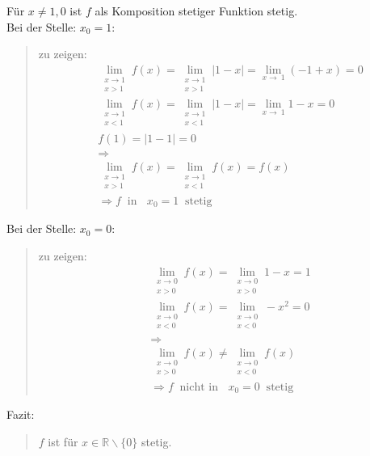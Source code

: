 Für $ x\neq 1,0 $ ist $ f $ als Komposition stetiger Funktion stetig.\vspace*{2mm}\\
\newpage
\noindent
\textbullet \;\; Bei der Stelle: $ x_0=1 $:
\begin{quote}
	zu zeigen:\\
	\begin{align*}
	&\lim\limits_ {\substack{x \to 1 \\ x>1}} f(x)=	\lim\limits_ {\substack{x \to 1 \\ x>1}}|1-x|=\lim\limits_ {x\to\ 1}(-1+x)=0\\
	&\lim\limits_ {\substack{x \to 1 \\ x<1}} f(x)=	\lim\limits_ {\substack{x \to 1 \\ x<1}}|1-x|=\lim\limits_ {x\to\ 1}1-x=0\\
	&f(1)=|1-1|=0\\
	&\Rightarrow\\
	&\lim\limits_ {\substack{x \to 1 \\ x>1}} f(x)=\lim\limits_ {\substack{x \to 1 \\ x<1}}f(x)=f(x)\\
	&\Rightarrow f\;\; \text{in }\;\;x_0=1\;\;\text{stetig }
	\end{align*}
	
\end{quote}
\textbullet \;\; Bei der Stelle: $ x_0=0 $:
\begin{quote}
	zu zeigen:\\
	\begin{align*}
	&\lim\limits_ {\substack{x \to 0 \\ x>0}}f(x)=\lim\limits_ {\substack{x \to 0 \\ x>0}}1-x=1\\
	&\lim\limits_ {\substack{x \to 0 \\ x<0}}f(x)=\lim\limits_ {\substack{x \to 0 \\ x<0}}-x^2=0\\
	&\Rightarrow\\
	&\lim\limits_ {\substack{x \to 0 \\ x>0}}f(x)\neq\lim\limits_ {\substack{x \to 0 \\ x<0}}f(x)\\
	&\Rightarrow f\;\; \text{nicht in }\;\;x_0=0\;\;\text{stetig }
	\end{align*}
\end{quote}
Fazit:\\
\begin{quote}
	$ f $ ist für $ x\in \mathbb{R}\backslash\{0\} $ stetig.\\
\end{quote}
